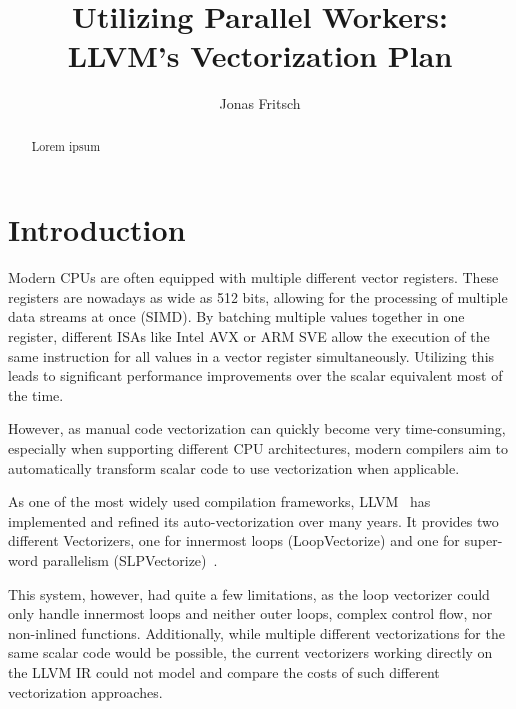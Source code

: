 \documentclass[sigplan,11pt,nonacm]{acmart}
\begin{document}
\title{Utilizing Parallel Workers: \\LLVM's Vectorization Plan}
\author{Jonas Fritsch}

\begin{abstract}
Lorem ipsum
\end{abstract}

\maketitle



\section{Introduction}
\label{sec:introduction}
Modern CPUs are often equipped with multiple different vector registers. These registers are nowadays 
as wide as 512 bits, allowing for the processing of multiple data streams at once (SIMD). By 
batching multiple values together in one register, different ISAs like Intel AVX or ARM SVE allow 
the execution of the same instruction for all values in a vector register simultaneously. 
Utilizing this leads to significant performance improvements over the scalar equivalent most of 
the time.

However, as manual code vectorization can quickly become very time-consuming, especially when
supporting different CPU architectures, modern compilers aim to automatically transform scalar code
to use vectorization when applicable.

As one of the most widely used compilation frameworks, LLVM~\cite{10.5555/977395.977673} has 
implemented and refined its auto-vectorization over many years. It provides two different 
Vectorizers, one for innermost loops (LoopVectorize) and one for super-word parallelism 
(SLPVectorize)~\cite{llvmvec}.

This system, however, had quite a few limitations, as the loop vectorizer could only handle
innermost loops and neither outer loops, complex control flow, nor non-inlined functions. 
Additionally, while multiple different vectorizations for the same scalar code 
would be possible, the current vectorizers working directly on the LLVM IR could not model
and compare the costs of such different vectorization approaches.
\end{document}
